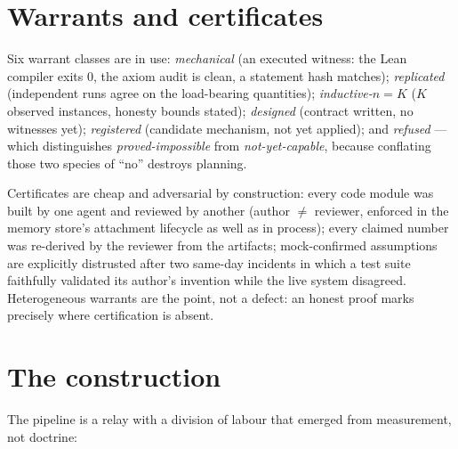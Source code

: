 \documentclass[11pt]{article}
\newcommand{\warrant}[1]{\textsl{#1}}
\begin{document}
\section{Warrants and certificates}

Six warrant classes are in use: \warrant{mechanical} (an executed
witness: the Lean compiler exits 0, the axiom audit is clean, a
statement hash matches); \warrant{replicated} (independent runs agree
on the load-bearing quantities); \warrant{inductive-$n{=}K$} ($K$
observed instances, honesty bounds stated); \warrant{designed}
(contract written, no witnesses yet); \warrant{registered} (candidate
mechanism, not yet applied); and \warrant{refused} --- which
distinguishes \emph{proved-impossible} from \emph{not-yet-capable},
because conflating those two species of ``no'' destroys planning.

Certificates are cheap and adversarial by construction: every code
module was built by one agent and reviewed by another (author
$\neq$ reviewer, enforced in the memory store's attachment lifecycle
as well as in process); every claimed number was re-derived by the
reviewer from the artifacts; mock-confirmed assumptions are
explicitly distrusted after two same-day incidents in which a test
suite faithfully validated its author's invention while the live
system disagreed. Heterogeneous warrants are the point, not a defect:
an honest proof marks precisely where certification is absent.

\section{The construction}

The pipeline is a relay with a division of labour that emerged from
measurement, not doctrine:
\end{document}
